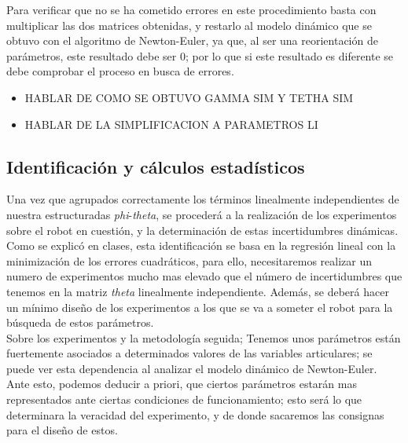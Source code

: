 \begin{itemize}
Para verificar que no se ha cometido errores en este procedimiento basta con multiplicar las dos matrices obtenidas, y restarlo al modelo dinámico
que se obtuvo con el algoritmo de Newton-Euler, ya que, al ser una reorientación de parámetros, este resultado debe ser 0; por lo que
si este resultado es diferente se debe comprobar el proceso en busca de errores.
\end{itemize}

	\begin{itemize}

		\item HABLAR DE COMO SE OBTUVO GAMMA SIM Y TETHA SIM
		\item HABLAR DE LA SIMPLIFICACION A PARAMETROS LI



	\end{itemize}

	\newpage

	\subsection{Identificación y cálculos estadísticos}

	Una vez que agrupados correctamente los términos linealmente independientes de nuestra estructuradas
	\textit{phi}-\textit{theta}, se procederá a la realización de los experimentos sobre
	el robot en cuestión, y la determinación de estas incertidumbres dinámicas.\\

	Como se explicó en clases, esta identificación se basa en la regresión lineal con la minimización de los
	errores cuadráticos, para ello, necesitaremos realizar un numero de experimentos mucho mas elevado que el número
	de incertidumbres que tenemos en la matriz \textit{theta} linealmente independiente. Además, se deberá hacer
	un mínimo diseño de los experimentos a los que se va a someter el robot para la búsqueda de estos parámetros.\\

	Sobre los experimentos y la metodología seguida; Tenemos unos parámetros están fuertemente asociados a determinados
	valores de las variables articulares; se puede ver esta dependencia al analizar el modelo dinámico de Newton-Euler.
	 Ante esto, podemos deducir a priori, que ciertos parámetros estarán mas representados ante ciertas condiciones de funcionamiento; esto será lo que determinara la
	veracidad del experimento, y de donde sacaremos las consignas para el diseño de estos.\\

